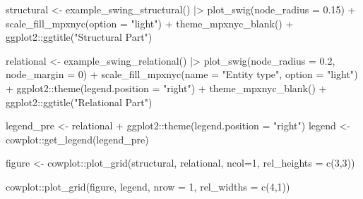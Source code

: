 \documentclass[
  letterpaper,
  DIV=11,
  numbers=noendperiod,
  oneside]{scrreprt}
\newenvironment{Shaded}{\begin{snugshade}}{\end{snugshade}}
\newcommand{\AttributeTok}[1]{\textcolor[rgb]{0.40,0.45,0.13}{#1}}
\newcommand{\DecValTok}[1]{\textcolor[rgb]{0.68,0.00,0.00}{#1}}
\newcommand{\FloatTok}[1]{\textcolor[rgb]{0.68,0.00,0.00}{#1}}
\newcommand{\FunctionTok}[1]{\textcolor[rgb]{0.28,0.35,0.67}{#1}}
\newcommand{\NormalTok}[1]{\textcolor[rgb]{0.00,0.23,0.31}{#1}}
\newcommand{\OtherTok}[1]{\textcolor[rgb]{0.00,0.23,0.31}{#1}}
\newcommand{\SpecialCharTok}[1]{\textcolor[rgb]{0.37,0.37,0.37}{#1}}
\newcommand{\StringTok}[1]{\textcolor[rgb]{0.13,0.47,0.30}{#1}}
\begin{document}
\begin{Shaded}
\begin{Highlighting}[]
\NormalTok{structural  }\OtherTok{\textless{}{-}} \FunctionTok{example\_swing\_structural}\NormalTok{() }\SpecialCharTok{|\textgreater{}}
                    \FunctionTok{plot\_swig}\NormalTok{(}\AttributeTok{node\_radius =} \FloatTok{0.15}\NormalTok{) }\SpecialCharTok{+}
                    \FunctionTok{scale\_fill\_mpxnyc}\NormalTok{(}\AttributeTok{option =} \StringTok{"light"}\NormalTok{) }\SpecialCharTok{+}
                    \FunctionTok{theme\_mpxnyc\_blank}\NormalTok{() }\SpecialCharTok{+}
\NormalTok{                    ggplot2}\SpecialCharTok{::}\FunctionTok{ggtitle}\NormalTok{(}\StringTok{"Structural Part"}\NormalTok{) }


\NormalTok{relational  }\OtherTok{\textless{}{-}} \FunctionTok{example\_swing\_relational}\NormalTok{() }\SpecialCharTok{|\textgreater{}}
                    \FunctionTok{plot\_swig}\NormalTok{(}\AttributeTok{node\_radius =} \FloatTok{0.2}\NormalTok{, }\AttributeTok{node\_margin =} \DecValTok{0}\NormalTok{)  }\SpecialCharTok{+}
                    \FunctionTok{scale\_fill\_mpxnyc}\NormalTok{(}\AttributeTok{name =} \StringTok{"Entity type"}\NormalTok{, }\AttributeTok{option =} \StringTok{"light"}\NormalTok{) }\SpecialCharTok{+}
\NormalTok{                    ggplot2}\SpecialCharTok{::}\FunctionTok{theme}\NormalTok{(}\AttributeTok{legend.position =} \StringTok{"right"}\NormalTok{) }\SpecialCharTok{+}
                    \FunctionTok{theme\_mpxnyc\_blank}\NormalTok{() }\SpecialCharTok{+}
\NormalTok{                    ggplot2}\SpecialCharTok{::}\FunctionTok{ggtitle}\NormalTok{(}\StringTok{"Relational Part"}\NormalTok{)}


\NormalTok{legend\_pre  }\OtherTok{\textless{}{-}}\NormalTok{ relational }\SpecialCharTok{+}
\NormalTok{                    ggplot2}\SpecialCharTok{::}\FunctionTok{theme}\NormalTok{(}\AttributeTok{legend.position =} \StringTok{"right"}\NormalTok{)}
\NormalTok{legend      }\OtherTok{\textless{}{-}}\NormalTok{ cowplot}\SpecialCharTok{::}\FunctionTok{get\_legend}\NormalTok{(legend\_pre) }



\NormalTok{figure   }\OtherTok{\textless{}{-}}\NormalTok{ cowplot}\SpecialCharTok{::}\FunctionTok{plot\_grid}\NormalTok{(structural, relational, }\AttributeTok{ncol=}\DecValTok{1}\NormalTok{, }\AttributeTok{rel\_heights =} \FunctionTok{c}\NormalTok{(}\DecValTok{3}\NormalTok{,}\DecValTok{3}\NormalTok{))}

\NormalTok{cowplot}\SpecialCharTok{::}\FunctionTok{plot\_grid}\NormalTok{(figure, legend, }\AttributeTok{nrow =} \DecValTok{1}\NormalTok{, }\AttributeTok{rel\_widths =} \FunctionTok{c}\NormalTok{(}\DecValTok{4}\NormalTok{,}\DecValTok{1}\NormalTok{))}
\end{Highlighting}
\end{Shaded}
\end{document}
